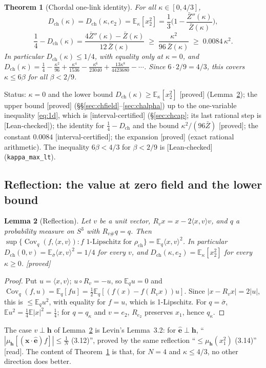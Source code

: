 \documentclass[11pt,a4paper]{article}
\newtheorem{theorem}{Theorem}
\newtheorem{lemma}[theorem]{Lemma}
\theoremstyle{remark}
\theoremstyle{definition}
\newcommand{\E}{\mathbb{E}}
\newcommand{\Cov}{\operatorname{Cov}}
\newcommand{\st}[1]{\textsf{[#1]}}
\newcommand{\Zb}{\bar Z}
\newcommand{\Dch}{D_{\mathrm{ch}}}
\newcommand{\rch}{\rho_{\mathrm{ch}}}
\begin{document}
\begin{theorem}[Chordal one-link identity]\label{thm:chordal}
For all $\kappa\in[0,4/3]$,
\[
\Dch(\kappa)=\Dch(\kappa,e_2)=\E_\kappa[x_2^2]=\frac13\Big(1-\frac{\Zb''(\kappa)}{\Zb(\kappa)}\Big),
\]
\[
\frac14-\Dch(\kappa)=\frac{4\Zb''(\kappa)-\Zb(\kappa)}{12\,\Zb(\kappa)}\;\ge\;\frac{\kappa^2}{96\,\Zb(\kappa)}\;\ge\;0.0084\,\kappa^2 .
\]
In particular $\Dch(\kappa)\le1/4$, with equality only at $\kappa=0$, and
$\Dch(\kappa)=\frac14-\frac{\kappa^2}{96}+\frac{\kappa^4}{1536}-\frac{\kappa^6}{23040}+\frac{13\kappa^8}{4423680}-\cdots$.
Since $6\cdot2/9=4/3$, this covers $\kappa\le6\beta$ for all $\beta<2/9$.
\end{theorem}
\noindent Status: $\kappa=0$ and the lower bound $\Dch(\kappa)\ge\E_\kappa[x_2^2]$ \st{proved} (Lemma~\ref{lem:refl});
the upper bound \st{proved} (\S\S\ref{sec:chfield}--\ref{sec:chalpha}) up to the one-variable inequality
\eqref{eq:1d}, which is \st{interval-certified} (\S\ref{sec:chcap}; its last rational step is \st{Lean-checked});
the identity for $\frac14-\Dch$ and the bound $\kappa^2/(96\Zb)$ \st{proved}; the constant $0.0084$
\st{interval-certified}; the expansion \st{proved} (exact rational arithmetic). The inequality $6\beta<4/3$ for
$\beta<2/9$ is \st{Lean-checked} (\texttt{kappa\_max\_lt}).

\subsection{Reflection: the value at zero field and the lower bound}\label{sec:chrefl}

\begin{lemma}[Reflection]\label{lem:refl}
Let $v$ be a unit vector, $R_v x=x-2\langle x,v\rangle v$, and $q$ a probability measure on $S^3$ with
$R_{v\#}q=q$. Then $\sup\{\Cov_q(f,\langle x,v\rangle): f \text{ 1-Lipschitz for }\rch\}=\E_q\langle x,v\rangle^2$.
In particular $\Dch(0,v)=\E_{\bar\sigma}\langle x,v\rangle^2=1/4$ for every $v$, and
$\Dch(\kappa,e_2)=\E_\kappa[x_2^2]$ for every $\kappa\ge0$. \st{proved}
\end{lemma}
\begin{proof}
Put $u=\langle x,v\rangle$; $u\circ R_v=-u$, so $\E_qu=0$ and $\Cov_q(f,u)=\E_q[fu]=\frac12\E_q[(f(x)-f(R_vx))u]$.
Since $|x-R_vx|=2|u|$, this is $\le\E_q u^2$, with equality for $f=u$, which is 1-Lipschitz. For $q=\bar\sigma$,
$\E u^2=\frac14\E|x|^2=\frac14$; for $q=q_\kappa$ and $v=e_2$, $R_{e_2}$ preserves $x_1$, hence $q_\kappa$.
\end{proof}
The case $v\perp\mathbf h$ of Lemma~\ref{lem:refl} is Levin's Lemma~3.2: for $\hat{\mathbf e}\perp\mathbf h$,
``$|\mu_{\mathbf h}[(\mathbf x\cdot\hat{\mathbf e})f]|\leqslant\frac1N$ (3.12)'', proved by the same reflection
``$\leqslant\mu_{\mathbf h}(x_1^2)$ (3.14)'' \cite[p.~68]{Lev80} \st{read}. The content of
Theorem~\ref{thm:chordal} is that, for $N=4$ and $\kappa\le4/3$, no other direction does better.
\end{document}
